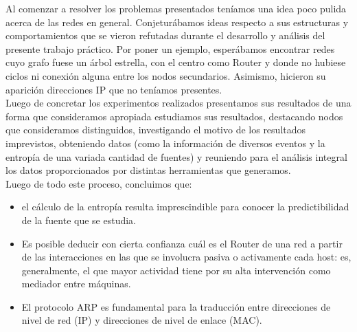 Al comenzar a resolver los problemas presentados teníamos una idea poco pulida acerca de las redes en general. Conjeturábamos ideas respecto a sus estructuras y comportamientos que se vieron refutadas durante el desarrollo y análisis del presente trabajo práctico. Por poner un ejemplo, esperábamos encontrar redes cuyo grafo fuese un árbol estrella, con el centro como Router y donde no hubiese ciclos ni conexión alguna entre los nodos secundarios. Asimismo, hicieron su aparición direcciones IP que no teníamos presentes.\\
Luego de concretar los experimentos realizados presentamos sus resultados de una forma que consideramos apropiada estudiamos sus resultados, destacando nodos que consideramos distinguidos, investigando el motivo de los resultados imprevistos, obteniendo datos (como la información de diversos eventos y la entropía de una variada cantidad de fuentes) y reuniendo para el análisis integral los datos proporcionados por distintas herramientas que generamos.\\
Luego de todo este proceso, concluimos que:
\begin{itemize}
	\item el cálculo de la entropía resulta imprescindible para conocer la predictibilidad de la fuente que se estudia. 
	\item Es posible deducir con cierta confianza cuál es el Router de una red a partir de las interacciones en las que se involucra pasiva o activamente cada host: es, generalmente, el que mayor actividad tiene por su alta intervención como mediador entre máquinas.
    \item El protocolo ARP es fundamental para la traducción entre direcciones de nivel de red (IP) y direcciones de nivel de enlace (MAC).  
\end{itemize}
